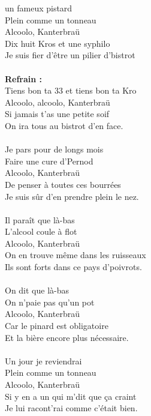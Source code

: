 \vspace{-0.3cm}
 un fameux pistard
\\Plein comme un tonneau
\\Alcoolo, Kanterbraü
\\Dix huit Kros et une syphilo
\\Je suis fier d'être un pilier d'bistrot
\\\\\textbf{Refrain :}
\\Tiens bon ta 33 et tiens bon ta Kro
\\Alcoolo, alcoolo, Kanterbraü
\\Si jamais t'as une petite soif
\\On ira tous au bistrot d'en face.
\\\\Je pars pour de longs mois
\\Faire une cure d'Pernod
\\Alcoolo, Kanterbraü
\\De penser à toutes ces bourrées
\\Je suis sûr d'en prendre plein le nez.
\\\\Il paraît que là-bas
\\L'alcool coule à flot
\\Alcoolo, Kanterbraü
\\On en trouve même dans les ruisseaux
\\Ils sont forts dans ce pays d'poivrots.
\\\\On dit que là-bas
\\On n'paie pas qu'un pot
\\Alcoolo, Kanterbraü
\\Car le pinard est obligatoire
\\Et la bière encore plus nécessaire.
\\\\Un jour je reviendrai
\\Plein comme un tonneau
\\Alcoolo, Kanterbraü
\\Si y en a un qui m'dit que ça craint
\\Je lui racont'rai comme c'était bien.

\breakpage